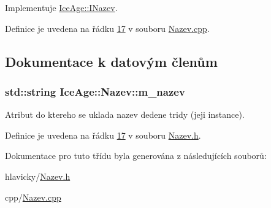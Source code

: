 Implementuje \hyperlink{classIceAge_1_1INazev_a5505f37cebf3dd811c6ca03058a0aa2d}{Ice\+Age\+::\+I\+Nazev}.



Definice je uvedena na řádku \hyperlink{Nazev_8cpp_source_l00017}{17} v souboru \hyperlink{Nazev_8cpp_source}{Nazev.\+cpp}.



\subsection{Dokumentace k datovým členům}
\subsubsection[{\texorpdfstring{m\+\_\+nazev}{m_nazev}}]{\setlength{\rightskip}{0pt plus 5cm}std\+::string Ice\+Age\+::\+Nazev\+::m\+\_\+nazev\hspace{0.3cm}{\ttfamily [protected]}}\hypertarget{classIceAge_1_1Nazev_a247a9f15b6c2f5ee361570530b75b8ce}{}\label{classIceAge_1_1Nazev_a247a9f15b6c2f5ee361570530b75b8ce}


Atribut do ktereho se uklada nazev dedene tridy (jeji instance). 



Definice je uvedena na řádku \hyperlink{Nazev_8h_source_l00017}{17} v souboru \hyperlink{Nazev_8h_source}{Nazev.\+h}.



Dokumentace pro tuto třídu byla generována z následujících souborů\+:\begin{DoxyCompactItemize}
\item 
hlavicky/\hyperlink{Nazev_8h}{Nazev.\+h}\item 
cpp/\hyperlink{Nazev_8cpp}{Nazev.\+cpp}\end{DoxyCompactItemize}
